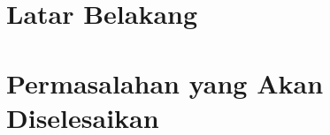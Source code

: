 \section{Latar Belakang}
\label{sec:Latar_Belakang}




\section{Permasalahan yang Akan Diselesaikan}
\label{sec:Permasalahan_yang_Akan_Diselesaikan}



